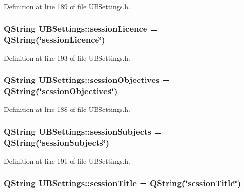 Definition at line 189 of file U\-B\-Settings.\-h.

\hypertarget{class_u_b_settings_a6f486e7b7b356cd99f419eb6c5e3755d}{
\subsubsection[{session\-Licence}]{\setlength{\rightskip}{0pt plus 5cm}Q\-String U\-B\-Settings\-::session\-Licence = Q\-String(\char`\"{}session\-Licence\char`\"{})\hspace{0.3cm}{\ttfamily [static]}}}\label{db/d66/class_u_b_settings_a6f486e7b7b356cd99f419eb6c5e3755d}


Definition at line 193 of file U\-B\-Settings.\-h.

\hypertarget{class_u_b_settings_a0e8511b43547195f233f69ac7ce7b175}{
\subsubsection[{session\-Objectives}]{\setlength{\rightskip}{0pt plus 5cm}Q\-String U\-B\-Settings\-::session\-Objectives = Q\-String(\char`\"{}session\-Objectives\char`\"{})\hspace{0.3cm}{\ttfamily [static]}}}\label{db/d66/class_u_b_settings_a0e8511b43547195f233f69ac7ce7b175}


Definition at line 188 of file U\-B\-Settings.\-h.

\hypertarget{class_u_b_settings_a1dc8e4fbe35dfece6037896731af8a5c}{
\subsubsection[{session\-Subjects}]{\setlength{\rightskip}{0pt plus 5cm}Q\-String U\-B\-Settings\-::session\-Subjects = Q\-String(\char`\"{}session\-Subjects\char`\"{})\hspace{0.3cm}{\ttfamily [static]}}}\label{db/d66/class_u_b_settings_a1dc8e4fbe35dfece6037896731af8a5c}


Definition at line 191 of file U\-B\-Settings.\-h.

\hypertarget{class_u_b_settings_a541db9f46c2319a1a9f43052cf338abf}{
\subsubsection[{session\-Title}]{\setlength{\rightskip}{0pt plus 5cm}Q\-String U\-B\-Settings\-::session\-Title = Q\-String(\char`\"{}session\-Title\char`\"{})\hspace{0.3cm}{\ttfamily [static]}}}\label{db/d66/class_u_b_settings_a541db9f46c2319a1a9f43052cf338abf}


